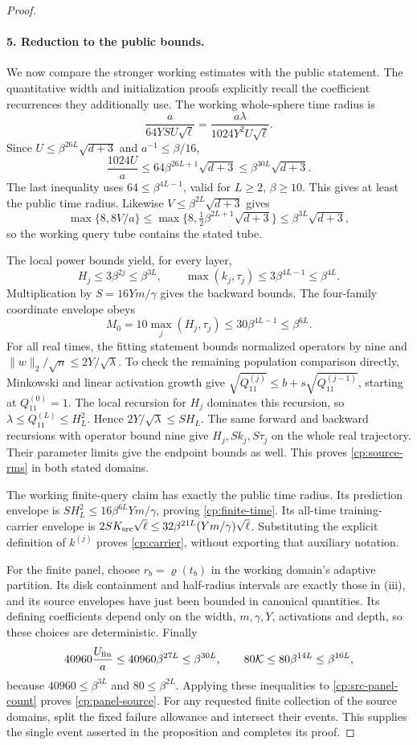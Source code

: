 \begin{proof}
\paragraph{5. Reduction to the public bounds.}
We now compare the stronger working estimates with the public statement.
The quantitative width and initialization proofs explicitly recall the
coefficient recurrences they additionally use. The working whole-sphere
time radius is
\[
 \frac{a}{64YSU\sqrt\ell}
   =\frac{a\lambda}{1024Y^2U\sqrt\ell}.
\]
Since \(U\le\beta^{26L}\sqrt{d+3}\) and \(a^{-1}\le\beta/16\),
\[
 \frac{1024U}{a}
 \le64\beta^{26L+1}\sqrt{d+3}
 \le\beta^{30L}\sqrt{d+3}.
\]
The last inequality uses \(64\le\beta^{4L-1}\), valid for
\(L\ge2\), \(\beta\ge10\).  This gives at least the public time
radius.  Likewise \(V\le\beta^{2L}\sqrt{d+3}\) gives
\[
 \max\{8,8V/a\}
 \le\max\{8,\tfrac12\beta^{2L+1}\sqrt{d+3}\}
 \le\beta^{3L}\sqrt{d+3},
\]
so the working query tube contains the stated tube.

The local power bounds yield, for every layer,
\[
 H_j\le3\beta^{2j}\le\beta^{3L},\qquad
 \max(k_j,\tau_j)\le3\beta^{4L-1}\le\beta^{4L}.
\]
Multiplication by \(S=16Ym/\gamma\) gives the backward bounds.
The four-family coordinate envelope obeys
\[
 M_0=10\max_j(H_j,\tau_j)
 \le30\beta^{4L-1}\le\beta^{6L}.
\]
For all real times, the fitting statement bounds normalized operators by
nine and \(\|w\|_2/\sqrt n\le2Y/\sqrt\lambda\).  To check the
remaining population comparison directly, Minkowski and linear activation
growth give
\(\sqrt{Q^{(j)}_{11}}\le b+s\sqrt{Q^{(j-1)}_{11}}\), starting at
\(Q^{(0)}_{11}=1\).  The local recursion for \(H_j\) dominates this
recursion, so \(\lambda\le Q^{(L)}_{11}\le H_L^2\).
Hence \(2Y/\sqrt\lambda\le SH_L\).  The same forward and backward
recursions with operator bound nine give \(H_j,Sk_j,S\tau_j\)
on the whole real trajectory.  Their parameter limits give the endpoint
bounds as well.  This proves \eqref{cp:source-rms} in both stated domains.

The working finite-query claim has exactly the public time radius.  Its
prediction envelope is \(SH_L^2\le16\beta^{6L}Ym/\gamma\), proving
\eqref{cp:finite-time}.  Its all-time training-carrier envelope is
\(2SK_{\rm src}\sqrt\ell\le32\beta^{21L}(Ym/\gamma)\sqrt\ell\).
Substituting the explicit definition of \(k^{(j)}\) proves
\eqref{cp:carrier}, without exporting that auxiliary notation.

For the finite panel, choose \(r_b=\varrho(t_b)\) in the working
domain's adaptive partition.  Its disk containment and half-radius
intervals are exactly those in (iii), and its source envelopes have just
been bounded in canonical quantities.  Its defining coefficients depend
only on the width, \(m,\gamma,Y\), activations and depth, so these choices
are deterministic.  Finally
\[
 40960\frac{U_{\rm fin}}a\le40960\beta^{27L}\le\beta^{30L},
 \qquad 80\mathcal K\le80\beta^{14L}\le\beta^{16L},
\]
because \(40960\le\beta^{3L}\) and \(80\le\beta^{2L}\).
Applying these inequalities to \eqref{cp:src-panel-count} proves
\eqref{cp:panel-source}.  For any requested finite collection of the
source domains, split the fixed failure allowance and intersect their
events.  This supplies the single event asserted in the proposition and
completes its proof.
\end{proof}
